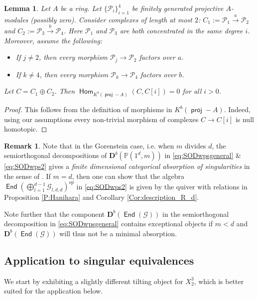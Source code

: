 \documentclass[a4paper,11pt, reqno]{amsart}
\def\P{\mathbb P}
\def\DD{\mathbf D}
\def\sG{\mathscr{G}}
\def\sP{\mathscr{P}}
\newcommand{\opname}[1]{\operatorname{\mathsf{#1}}}
\newcommand{\Hom}{\opname{Hom}}
\newcommand{\End}{\opname{End}}
\newcommand{\op}{^{op}}
\def\Db{\DD^b}
\newcommand{\proj}{\opname{proj}\nolimits}
\theoremstyle{plain}
\newtheorem{lemma}[dummy]{Lemma}
\theoremstyle{definition}
\newtheorem{remark}[dummy]{Remark}
\numberwithin{equation}{section}
\newlength{\arrow}
\begin{document}
\begin{lemma}\label{L:Approximation}
Let $A$ be a ring. Let $\{\sP_i\}_{i=1}^4$ be finitely generated projective $A$-modules (possibly zero). Consider
complexes of length at most $2$: $C_1:=\sP_1 \xrightarrow{a} \sP_2$ and $C_2:=\sP_3 \xrightarrow{b} \sP_4$. Here $\sP_1$ and $\sP_3$  are both concentrated in the same degree $i$.
Moreover, assume the following:
\begin{itemize}
\item[(a)] If $j \neq 2$, then every morphism $\sP_j \to \sP_2$ factors over $a$. 
\item[(b)] If $k \neq 4$, then every morphism $\sP_k \to \sP_4$ factors over $b$. 
\end{itemize}
Let $C=C_1 \oplus C_2$. Then $\Hom_{K^b(\proj-A)}(C, C[i])=0$ for all $i>0$.
\end{lemma}

\begin{proof}
This follows from the definition of morphisms in $K^b(\proj-A)$. Indeed, using our assumptions every non-trivial morphism of complexes $C \to C[i]$ is null homotopic.
\end{proof}


\begin{remark}
Note that in the Gorenstein case, i.e. when $m$ divides $d$, the semiorthogonal decompositions of $\Db( \P (1^d , m ) )$ in  \eqref{eq:SODwpsgeneral} \& \eqref{eq:SODwps2} gives a \emph{finite dimensional categorical absorption of singularities} in the sense of \cite{kalck-klapproth-pavic}. If $m=d$, then one can show that the algebra $\End\left(  \bigoplus_{l=1}^{d-1} \sG_{l , d , d} \right)\op$ in \eqref{eq:SODwps2} is given by the quiver with relations in Proposition \ref{P:Hanihara} and Corollary \ref{Cor:description_R_d}.


Note further that the component $\Db (\End (\sG ) )$ in the semiorthogonal decomposition in \eqref{eq:SODwpsgeneral} contains exceptional objects if $m<d$ and $\Db ( \End ( \sG ) )$ will thus not be a minimal absorption. 
\end{remark}

\subsection{Application to singular equivalences}

We start by exhibiting a slightly different tilting object for $X_2^3$, which is better suited for the application below.
\end{document}
